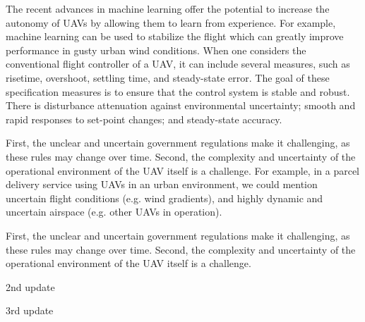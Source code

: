 \documentclass[sigconf]{acmart}
\begin{document}
The recent advances in machine learning offer the potential to increase the autonomy of UAVs by allowing them to learn from experience. For example, machine learning can be used to stabilize the flight which can greatly improve performance in gusty urban wind conditions. 
When one considers the conventional flight controller of a UAV, it can include several measures, such as risetime, overshoot, settling time, and steady-state error.
The goal of these specification measures is to ensure that the control system is stable and robust. 
There is disturbance attenuation against environmental uncertainty; smooth and rapid responses to set-point changes; and steady-state accuracy. 

First, the unclear and uncertain government regulations make it challenging, as these rules may change over time. 
Second, the complexity and uncertainty of the operational environment of the UAV itself is a challenge. 
For example, in a parcel delivery service using UAVs in an urban environment, we could mention uncertain flight conditions (e.g. wind gradients), and highly dynamic and uncertain airspace (e.g. other UAVs in operation). 

First, the unclear and uncertain government regulations make it challenging, as these rules may change over time. 
Second, the complexity and uncertainty of the operational environment of the UAV itself is a challenge. 

2nd update

3rd update 
\end{document}
